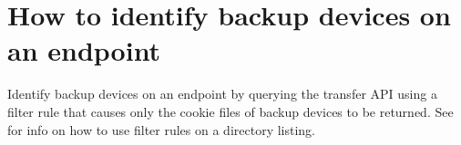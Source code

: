
\section{How to identify backup devices on an endpoint\label{appendix:identifybackupdevices}}

Identify backup devices on an endpoint by querying the transfer API
using a filter rule that causes only the cookie files of backup devices
to be returned. See  for info
on how to use filter rules on a directory listing.

